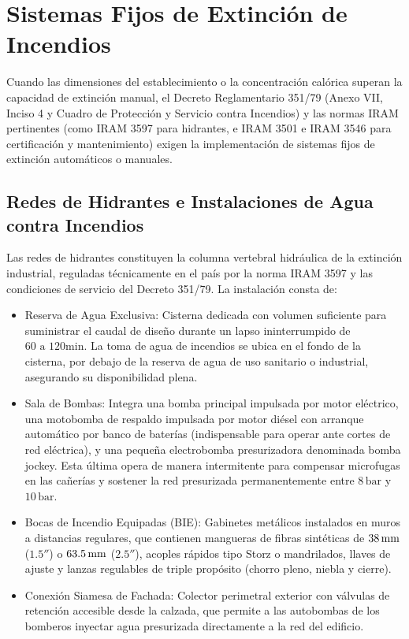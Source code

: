 \section{Sistemas Fijos de Extinción de Incendios}
\label{sec.cap6:sistemas_fijos}

Cuando las dimensiones del establecimiento o la concentración calórica superan la capacidad de extinción manual, el
Decreto Reglamentario 351/79 (Anexo VII, Inciso 4 y Cuadro de Protección y Servicio contra Incendios) y las normas IRAM
pertinentes (como IRAM 3597 para hidrantes, e IRAM 3501 e IRAM 3546 para certificación y mantenimiento) exigen la
implementación de sistemas fijos de extinción automáticos o manuales.

\subsection{Redes de Hidrantes e Instalaciones de Agua contra Incendios}

Las redes de hidrantes constituyen la columna vertebral hidráulica de la extinción industrial, reguladas técnicamente
en el país por la norma IRAM 3597 y las condiciones de servicio del Decreto 351/79. La instalación consta de:
\begin{itemize}
    \item Reserva de Agua Exclusiva: Cisterna dedicada con volumen suficiente para suministrar el caudal de diseño durante
          un lapso ininterrumpido de $60\text{ a }120\unit{\minute}$. La toma de agua de incendios se ubica en el fondo de
          la cisterna, por debajo de la reserva de agua de uso sanitario o industrial, asegurando su disponibilidad plena.
    \item Sala de Bombas: Integra una bomba principal impulsada por motor eléctrico, una motobomba de respaldo impulsada
          por motor diésel con arranque automático por banco de baterías (indispensable para operar ante cortes de red
          eléctrica), y una pequeña electrobomba presurizadora denominada bomba jockey. Esta última opera de manera
          intermitente para compensar microfugas en las cañerías y sostener la red presurizada permanentemente entre
          $8\,\mathrm{bar}$ y $10\,\mathrm{bar}$.
    \item Bocas de Incendio Equipadas (BIE): Gabinetes metálicos instalados en muros a distancias regulares, que contienen
          mangueras de fibras sintéticas de $38\,\mathrm{mm}$ ($1.5''$) o $63.5\,\mathrm{mm}$ ($2.5''$), acoples rápidos tipo Storz o
          mandrilados, llaves de ajuste y lanzas regulables de triple propósito (chorro pleno, niebla y cierre).
    \item Conexión Siamesa de Fachada: Colector perimetral exterior con válvulas de retención accesible desde la calzada,
          que permite a las autobombas de los bomberos inyectar agua presurizada directamente a la red del edificio.
\end{itemize}

